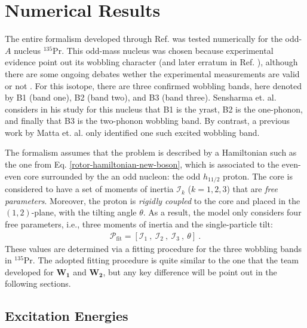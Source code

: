 \section{Numerical Results}

The entire formalism developed through Ref. \cite{raduta2020new} was tested numerically for the odd-$A$ nucleus $^{135}$Pr. This odd-mass nucleus was chosen because experimental evidence point out its wobbling character \cite{matta2017transverse} (and later erratum in Ref. \cite{matta2021erratum}), although there are some ongoing debates wether the experimental measurements are valid or not \cite{guo2021comment}. For this isotope, there are three confirmed wobbling bands, here denoted by B1 (band one), B2 (band two), and B3 (band three). Sensharma et. al. \cite{sensharma2019two} considers in his study for this nucleus that B1 is the yrast, B2 is the one-phonon, and finally that B3 is the two-phonon wobbling band. By contrast, a previous work by Matta et. al. \cite{matta2017transverse} only identified one such excited wobbling band.

The formalism assumes that the problem is described by a Hamiltonian such as the one from Eq. \ref{rotor-hamiltonian-new-boson}, which is associated to the even-even core surrounded by the an odd nucleon: the odd $h_{11/2}$ proton. The core is considered to have a set of moments of inertia $\mathcal{I}_k$ ($k=1,2,3$) that are \emph{free parameters}. Moreover, the proton is \emph{rigidly coupled} to the core and placed in the $(1,2)$-plane, with the tilting angle $\theta$. As a result, the model only considers four free parameters, i.e., three moments of inertia and the single-particle tilt:
\begin{align}
    \mathcal{P}_\text{fit}=\left[\mathcal{I}_1\ ,\ \mathcal{I}_2\ ,\ \mathcal{I}_3\ ,\ \theta\right]\ .
\end{align}
These values are determined via a fitting procedure for the three wobbling bands in $^{135}$Pr. The adopted fitting procedure is quite similar to the one that the team developed for $\mathbf{W_1}$ and $\mathbf{W_2}$, but any key difference will be point out in the following sections.

\subsection{Excitation Energies}

